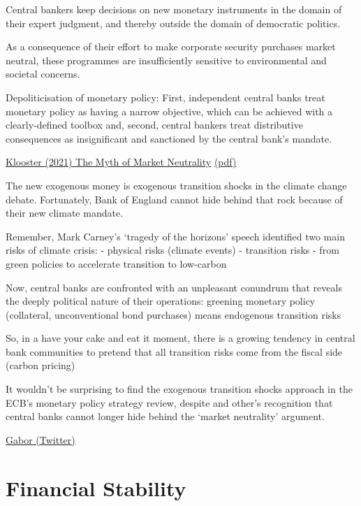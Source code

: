 \documentclass[
]{book}
\begin{document}
Central bankers keep decisions on new monetary instruments in the domain of their
expert judgment, and thereby outside the domain of democratic politics.

As a consequence of their effort to make corporate security purchases market neutral,
these programmes are insufficiently sensitive to environmental and societal concerns.

Depoliticisation of monetary policy: First, independent
central banks treat monetary policy as having a narrow objective, which can be achieved with a
clearly-defined toolbox and, second, central bankers treat distributive consequences as insignificant
and sanctioned by the central bank's mandate.

\href{https://www.tandfonline.com/doi/epub/10.1080/13563467.2019.1657077?needAccess=true}{Klooster (2021) The Myth of Market Neutrality}
\href{pdf/Klooster_2021_Myth_of_Market_Neutrality.pdf}{(pdf)}

The new exogenous money is exogenous transition shocks in the climate change debate.
Fortunately, Bank of England cannot hide behind that rock because of their new climate mandate.

Remember, Mark Carney's `tragedy of the horizons' speech identified two main risks of climate crisis:
- physical risks (climate events)
- transition risks - from green policies to accelerate transition to low-carbon

Now, central banks are confronted with an unpleasant conundrum that reveals the deeply political nature of their operations:
greening monetary policy (collateral, unconventional bond purchases) means endogenous transition risks

So, in a have your cake and eat it moment, there is a growing tendency in central bank communities to pretend that all transition risks come from the fiscal side (carbon pricing)

It wouldn't be surprising to find the exogenous transition shocks approach in the ECB's monetary policy strategy review, despite \citet{Lagarde}
and other's recognition that central banks cannot longer hide behind the `market neutrality' argument.

\href{https://twitter.com/DanielaGabor/status/1384837864412917765}{Gabor (Twitter)}

\hypertarget{financial-stability-1}{%
\section{Financial Stability}\label{financial-stability-1}}
\end{document}

